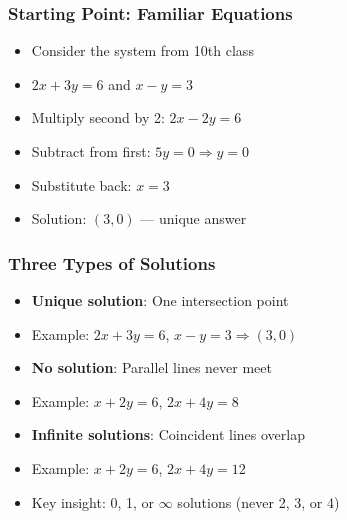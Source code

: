 \begin{frame}[fragile]\frametitle{Starting Point: Familiar Equations}
  \begin{itemize}
    \item Consider the system from 10th class
    \item $2x + 3y = 6$ and $x - y = 3$
    \item Multiply second by 2: $2x - 2y = 6$
    \item Subtract from first: $5y = 0 \Rightarrow y = 0$
    \item Substitute back: $x = 3$
    \item Solution: $(3, 0)$ — unique answer
  \end{itemize}
\end{frame}

\begin{frame}[fragile]\frametitle{Three Types of Solutions}
  \begin{itemize}
    \item \textbf{Unique solution}: One intersection point
    \item Example: $2x + 3y = 6$, $x - y = 3 \Rightarrow (3,0)$
    \item \textbf{No solution}: Parallel lines never meet
    \item Example: $x + 2y = 6$, $2x + 4y = 8$
    \item \textbf{Infinite solutions}: Coincident lines overlap
    \item Example: $x + 2y = 6$, $2x + 4y = 12$
    \item Key insight: 0, 1, or $\infty$ solutions (never 2, 3, or 4)
  \end{itemize}
\end{frame}

